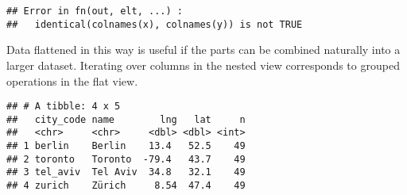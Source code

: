 \documentclass[]{book}
\newenvironment{Shaded}{\begin{snugshade}}{\end{snugshade}}
\newcommand{\CommentTok}[1]{\textcolor[rgb]{0.56,0.35,0.01}{\textit{#1}}}
\newcommand{\ControlFlowTok}[1]{\textcolor[rgb]{0.13,0.29,0.53}{\textbf{#1}}}
\newcommand{\DataTypeTok}[1]{\textcolor[rgb]{0.13,0.29,0.53}{#1}}
\newcommand{\KeywordTok}[1]{\textcolor[rgb]{0.13,0.29,0.53}{\textbf{#1}}}
\newcommand{\NormalTok}[1]{#1}
\newcommand{\OperatorTok}[1]{\textcolor[rgb]{0.81,0.36,0.00}{\textbf{#1}}}
\newcommand{\StringTok}[1]{\textcolor[rgb]{0.31,0.60,0.02}{#1}}
\begin{document}
\begin{Shaded}
\end{Shaded}

\begin{verbatim}
## Error in fn(out, elt, ...) : 
##   identical(colnames(x), colnames(y)) is not TRUE
\end{verbatim}

Data flattened in this way is useful if the parts can be combined naturally into a larger dataset.
Iterating over columns in the nested view corresponds to grouped operations in the flat view.

\begin{Shaded}
\end{Shaded}

\begin{verbatim}
## # A tibble: 4 x 5
##   city_code name        lng   lat     n
##   <chr>     <chr>     <dbl> <dbl> <int>
## 1 berlin    Berlin    13.4   52.5    49
## 2 toronto   Toronto  -79.4   43.7    49
## 3 tel_aviv  Tel Aviv  34.8   32.1    49
## 4 zurich    Zürich     8.54  47.4    49
\end{verbatim}

\begin{Shaded}
\end{Shaded}
\end{document}
